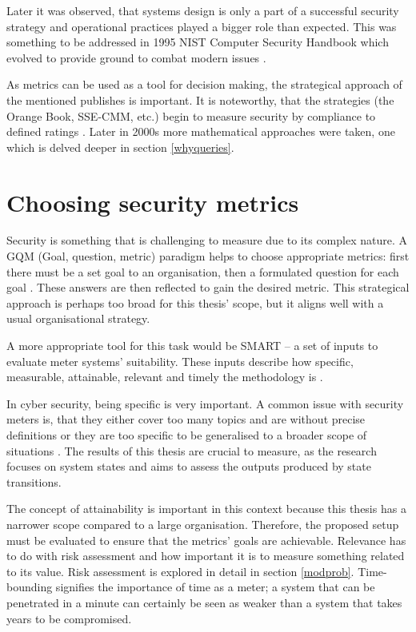 Later it was observed, that systems design is only a part of a
successful security strategy and operational practices played a
bigger role than expected. This was something to be addressed in 1995 NIST
Computer Security Handbook which evolved to provide ground to
combat modern issues \cite{bayuk2013measuring}.

As metrics can be used as a tool for decision making, the strategical
approach of the mentioned publishes is important. It is noteworthy, that
the strategies (the Orange Book, SSE-CMM, etc.) begin to measure
security by compliance to defined ratings \cite{bayuk2013measuring}. Later in 2000s more
mathematical approaches were taken, one which is delved deeper in
section \ref{whyqueries}. 

\section{Choosing security metrics} \label{choosingsecmet}

Security is something that is challenging to measure due to its
complex nature. A GQM (Goal, question, metric) paradigm helps to
choose appropriate metrics: first there must be a set goal to an
organisation, then a formulated question for each goal \cite{papazov2019cybersecurity}. These answers
are then reflected to gain the desired metric. This strategical
approach is perhaps too broad for this thesis' scope, but it aligns well
with a usual organisational strategy. 

A more appropriate tool for this task would be SMART – a set of inputs
to evaluate meter systems' suitability. These inputs describe how
specific, measurable, attainable, relevant and timely the methodology
is \cite{payne2006guide}.

In cyber security, being specific is very important. A common issue
with security meters is, that they either cover too many topics and
are without precise definitions or they are too specific to be
generalised to a broader scope of situations
\cite{wang2005information}. The results of this thesis are crucial to
measure, as the research focuses on system states and aims to assess
the outputs produced by state transitions.

The concept of attainability is important in this context because this
thesis has a narrower scope compared to a large
organisation. Therefore, the proposed setup must be evaluated to
ensure that the metrics' goals are achievable. Relevance has to do
with risk assessment and how important it is to measure something related
to its value. Risk assessment is explored in detail in section \ref{modprob}. Time-bounding signifies the
importance of time as a meter; a system that can be penetrated in a
minute can certainly be seen as weaker than a system that takes years
to be compromised.

